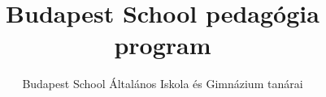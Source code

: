 \documentclass[magyar,12pt,a4paper,draft]{report}
\begin{document}
\newif\ifkerettanterv
\kerettantervfalse

\title{Budapest School pedagógia program}
\author{Budapest School Általános Iskola és Gimnázium tanárai}
\maketitle



\listoftodos[Notes]

\tableofcontents
\newpage
 



{}
\label{sec:bibliographyk}

 
\end{document}
